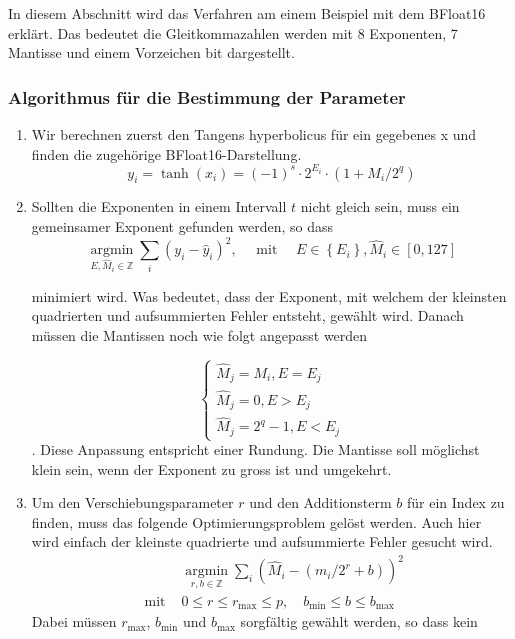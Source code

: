 In diesem Abschnitt wird das Verfahren am einem Beispiel mit dem BFloat16 erklärt. Das bedeutet die Gleitkommazahlen werden mit 8 Exponenten, 7 Mantisse und einem Vorzeichen bit dargestellt.

\subsubsection{Algorithmus für die Bestimmung der Parameter
	\label{transfer:subsection:Ktanh-Algorithmus:Algo}}

\begin{enumerate}
    \item Wir berechnen zuerst den Tangens hyperbolicus für ein gegebenes x und finden die zugehörige BFloat16-Darstellung.
    \[
    y_{i}=\operatorname{tanh}\left(x_{i}\right)=(-1)^{s} \cdot 2^{E_{i}} \cdot\left(1+M_{i} / 2^{q}\right)
    \]
     
    \item Sollten die Exponenten in einem Intervall $t$ nicht gleich sein, muss ein gemeinsamer Exponent gefunden werden, so dass 
    \begin{equation} \label{minforexp}
    \underset{E, \hat{M}_{i} \in \mathbb{Z}}{\operatorname{argmin}} \sum_{i}\left(y_{i}-\hat{y}_{i}\right)^{2}, \quad \text { mit } \quad E \in\left\{E_{i}\right\}, \hat{M}_{i} \in[0,127]
	\end{equation}

    minimiert wird. Was bedeutet, dass der Exponent, mit welchem der kleinsten quadrierten und aufsummierten Fehler entsteht, gewählt wird. Danach müssen die Mantissen noch wie folgt angepasst werden
    
    $$
    \left\{\begin{array}{l}
    	\hat{M}_{j}=M_{i}, E=E_{j} \\
    	\hat{M}_{j}=0, E>E_{j} \\
    	\hat{M}_{j}=2^{q}-1, E<E_{j}
    \end{array}\right.
    $$. Diese Anpassung entspricht einer Rundung. Die Mantisse soll möglichst klein sein, wenn der Exponent zu gross ist und umgekehrt.
    \item Um den Verschiebungsparameter $r$ und den Additionsterm $b$ für ein Index zu finden, muss das folgende Optimierungsproblem gelöst werden. Auch hier wird einfach der kleinste quadrierte und aufsummierte Fehler gesucht wird.
    $$
    \begin{array}{ll} 
    	& \underset{r, b \in \mathbb{Z}}{\operatorname{argmin}} \sum_{i}\left(\hat{M}_{i}-\left(m_{i} / 2^{r}+b\right)\right)^{2} \\
    	\text { mit } & 0 \leq r \leq r_{\max } \leq p, \quad b_{\min } \leq b \leq b_{\max }
    \end{array}
    $$
    Dabei müssen $r_{\max}$, $b_{\min}$ und $b_{\max}$ sorgfältig gewählt werden, so dass kein 
\end{enumerate}

